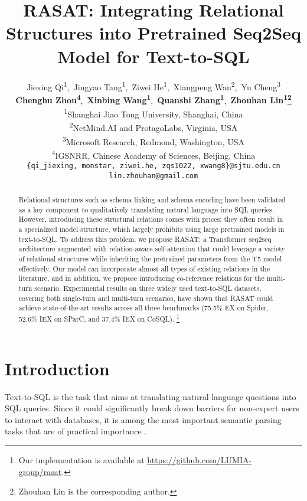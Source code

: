 \documentclass[11pt]{article}
\title{RASAT: Integrating Relational Structures into Pretrained Seq2Seq Model for Text-to-SQL}
\author{Jiexing Qi\textsuperscript{1},\ Jingyao Tang\textsuperscript{1},\ Ziwei He\textsuperscript{1},\ Xiangpeng Wan\textsuperscript{2},\ Yu Cheng\textsuperscript{3}\\ 
         \textbf{Chenghu Zhou\textsuperscript{4}},\  \textbf{Xinbing Wang\textsuperscript{1}},\ \textbf{Quanshi Zhang\textsuperscript{1}},\ \textbf{Zhouhan Lin\textsuperscript{1}\thanks{\quad  Zhouhan Lin is the corresponding author.}} \\
        \textsuperscript{1}Shanghai Jiao Tong University, Shanghai, China \\
         \textsuperscript{2}NetMind.AI and ProtagoLabs, Virginia, USA \\
        \textsuperscript{3}Microsoft Research, Redmond, Washington, USA \\
        \textsuperscript{4}IGSNRR, Chinese Academy of Sciences, Beijing, China\\
        \texttt{ \{qi\_jiexing, monstar, ziwei.he, zqs1022, xwang8\}@sjtu.edu.cn } \\
        \texttt{lin.zhouhan@gmail.com}}
\begin{document}
\maketitle
\begin{abstract}
Relational structures such as schema linking and schema encoding have been validated as a key component to qualitatively translating natural language into SQL queries. However, introducing these structural relations comes with prices: they often result in a specialized model structure, which largely prohibits using large pretrained models in text-to-SQL. To address this problem, we propose RASAT: a Transformer seq2seq architecture augmented with relation-aware self-attention that could leverage a variety of relational structures while inheriting the pretrained parameters from the T5 model effectively. Our model can incorporate almost all types of existing relations in the literature, and in addition, we propose introducing co-reference relations for the multi-turn scenario. Experimental results on three widely used text-to-SQL datasets, covering both single-turn and multi-turn scenarios, have shown that RASAT could achieve state-of-the-art results across all three benchmarks (75.5\% EX on Spider, 52.6\% IEX on SParC, and 37.4\% IEX on CoSQL). \footnote{Our implementation is available at  \url{https://github.com/LUMIA-group/rasat}. }
\end{abstract}

\section{Introduction}

Text-to-SQL is the task that aims at translating natural language questions into SQL queries. Since it could significantly break down barriers for non-expert users to interact with databases, it is among the most important semantic parsing tasks that are of practical importance \citep{kamath2018survey,deng-etal-2021-structure}. 
\end{document}
